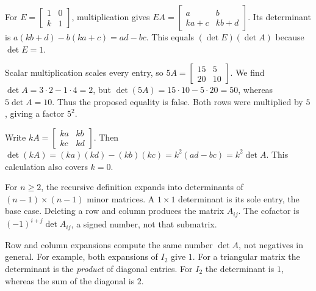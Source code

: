 For $E=\left[\begin{smallmatrix}1&0\\k&1\end{smallmatrix}\right]$, multiplication gives $EA=\left[\begin{smallmatrix}a&b\\ka+c&kb+d\end{smallmatrix}\right]$. Its determinant is $a(kb+d)-b(ka+c)=ad-bc$. This equals $(\det E)(\det A)$ because $\det E=1$.

Scalar multiplication scales every entry, so $5A=\left[\begin{smallmatrix}15&5\\20&10\end{smallmatrix}\right]$. We find $\det A=3\cdot2-1\cdot4=2$, but $\det(5A)=15\cdot10-5\cdot20=50$, whereas $5\det A=10$. Thus the proposed equality is false. Both rows were multiplied by $5$, giving a factor $5^2$.

Write $kA=\left[\begin{smallmatrix}ka&kb\\kc&kd\end{smallmatrix}\right]$. Then $\det(kA)=(ka)(kd)-(kb)(kc)=k^2(ad-bc)=k^2\det A$. This calculation also covers $k=0$.

 For $n\ge2$, the recursive definition expands into determinants of $(n-1)\times(n-1)$ minor matrices. A $1\times1$ determinant is its sole entry, the base case.
 Deleting a row and column produces the matrix $A_{ij}$. The cofactor is $(-1)^{i+j}\det A_{ij}$, a signed number, not that submatrix.

 Row and column expansions compute the same number $\det A$, not negatives in general. For example, both expansions of $I_2$ give $1$.
 For a triangular matrix the determinant is the \emph{product} of diagonal entries. For $I_2$ the determinant is $1$, whereas the sum of the diagonal is $2$.

